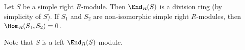 Let $S$ be a simple right $R$-module. Then $\End_R(S)$ is a division ring (by
simplicity of $S$). If $S_1$ and $S_2$ are non-isomorphic simple right $R$-modules,
then $\Hom_R(S_1, S_2) = 0$.

Note that $S$ is a left $\End_R(S)$-module.
